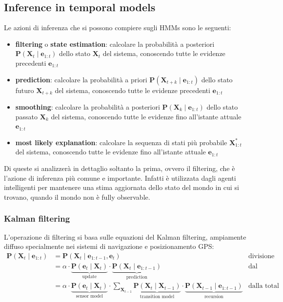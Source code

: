 \subsection{Inference in temporal models}
Le azioni di inferenza che si possono compiere sugli HMMs sono le seguenti:
\begin{itemize}
	\item \textbf{filtering} o \textbf{state estimation}: calcolare la probabilità a posteriori \(\textbf{P}(\textbf{X}_t \mid \textbf{e}_{1:t})\)
	dello stato  \(\textbf{X}_t\) del sistema, conoscendo tutte le evidenze precedenti \(\textbf{e}_{1:t}\)
	\item \textbf{prediction}: calcolare la probabilità a priori \(\textbf{P}(\textbf{X}_{t+k} \mid \textbf{e}_{1:t})\)
	dello stato futuro \(\textbf{X}_{t+k}\) del sistema, conoscendo tutte le evidenze precedenti \(\textbf{e}_{1:t}\)
	\item \textbf{smoothing}: calcolare la probabilità a posteriori \(\textbf{P}(\textbf{X}_k \mid \textbf{e}_{1:t})\)
	dello stato passato \(\textbf{X}_k\) del sistema, conoscendo tutte le evidenze fino all'istante attuale \(\textbf{e}_{1:t}\)
	\item \textbf{most likely explanation}: calcolare la sequenza di stati più probabile \(\textbf{X}_{1:t}^*\) del sistema,
	conoscendo tutte le evidenze fino all'istante attuale \(\textbf{e}_{1:t}\)
\end{itemize}
Di queste si analizzerà in dettaglio soltanto la prima, ovvero il filtering, che è l'azione di inferenza più comune e
importante. Infatti è utilizzata dagli agenti intelligenti per mantenere una stima aggiornata dello stato del mondo
in cui si trovano, quando il mondo non è fully observable. 

\subsubsection*{Kalman filtering}
L'operazione di filtering si basa sulle equazioni del Kalman filtering, ampiamente diffuso specialmente nei sistemi
di navigazione e posizionamento GPS:
\begin{align*}
	\textbf{P}(\textbf{X}_t \mid \textbf{e}_{1:t}) &= \textbf{P}(\textbf{X}_t \mid \textbf{e}_{1:t-1}, \textbf{e}_t) &\text{divisione delle evidenze} \\[6pt]
	&= \alpha \cdot \underbrace{\textbf{P}(\textbf{e}_t \mid \textbf{X}_t)}_{\text{update}} \cdot \underbrace{\textbf{P}(\textbf{X}_t \mid \textbf{e}_{1:t-1})}_{\text{prediction}} &\text{dal teorema di Bayes} \\[10pt]
	&= \alpha \cdot \underbrace{\textbf{P}(\textbf{e}_t \mid \textbf{X}_t)}_{\text{sensor model}} \cdot \sum_{\textbf{X}_{t-1}} \underbrace{\textbf{P}(\textbf{X}_t \mid \textbf{X}_{t-1})}_{\text{transition model}} \cdot \underbrace{\textbf{P}(\textbf{X}_{t-1} \mid \textbf{e}_{1:t-1})}_{\text{recursion}} &\text{dalla total probability rule}
\end{align*}

